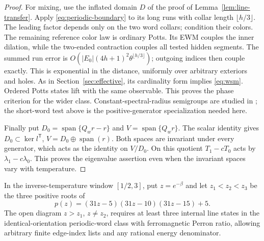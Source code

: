 \begin{proof}
For mixing, use the inflated domain \(D\) of the proof of Lemma~\ref{lem:line-transfer}. Apply \eqref{eq:periodic-boundary} to its long runs with collar length \(\lfloor h/3\rfloor\). The leading factor depends only on the two word collars; condition their colors. The remaining reference color law is ordinary Potts. Its EWM couples the inner dilation, while the two-ended contraction couples all tested hidden segments. The summed run error is \(O(|E_0|(4h+1)^2\theta^{\lfloor h/3\rfloor})\); outgoing indices then couple exactly. This is exponential in the distance, uniformly over arbitrary exteriors and holes. As in Section~\ref{sec:effective}, its cardinality form implies \eqref{eq:wsm}. Ordered Potts states lift with the same observable. This proves the phase criterion for the wider class. Constant-spectral-radius semigroups are studied in \cite{protasovVoynov}; the short-word test above is the positive-generator specialization needed here.

Finally put \(D_0=\operatorname{span}\{Q_wr-r\}\) and \(V=\operatorname{span}\{Q_wr\}\). The scalar identity gives \(D_0\subset\ker l^{\mathsf T}\), \(V=D_0\oplus\operatorname{span}(r)\). Both spaces are invariant under every generator, which acts as the identity on \(V/D_0\). On this quotient \(T_1-cT_0\) acts by \(\lambda_1-c\lambda_0\). This proves the eigenvalue assertion even when the invariant spaces vary with temperature.
\end{proof}

\begin{proposition}\label{prop:three-lower}
In the inverse-temperature window \([1/2,3]\), put \(z=e^{-\beta}\) and let \(z_1<z_2<z_3\) be the three positive roots of
\[
p(z)=(31z-5)(31z-10)(31z-15)+5.
\]
The open diagram \(z>z_1\), \(z\ne z_2\), requires at least three internal line states in the identical-orientation periodic-word class with ferromagnetic Perron ratio, allowing arbitrary finite edge-index lists and any rational energy denominator.
\end{proposition}


